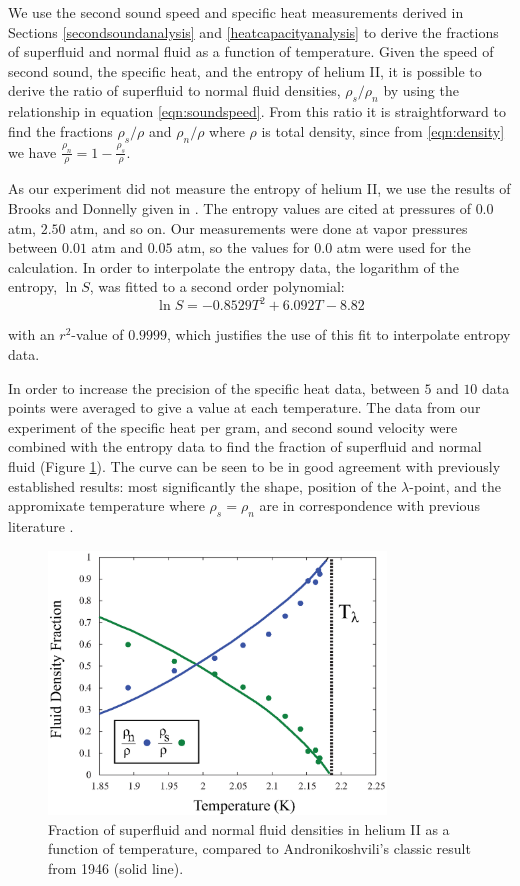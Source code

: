 We use the second sound speed and specific heat measurements derived
in Sections \ref{secondsoundanalysis} and \ref{heatcapacityanalysis}
to derive the fractions of superfluid and normal fluid as a function
of temperature. Given the speed of second sound, the specific heat,
and the entropy of helium II, it is possible to derive the ratio of
superfluid to normal fluid densities, $\rho_s/\rho_n$ by using the
relationship in equation \ref{eqn:soundspeed}. From this ratio it is
straightforward to find the fractions $\rho_s/\rho$ and $\rho_n/\rho$
where $\rho$ is total density, since from \ref{eqn:density} we have
$\frac{\rho_n}{\rho} = 1 - \frac{\rho_s}{\rho}$.

As our experiment did not measure the entropy of helium II, we use the
results of Brooks and Donnelly given in \cite{brooks}. The entropy
values are cited at pressures of $0.0$ atm, $2.50$ atm, and so on. Our
measurements were done at vapor pressures between $0.01$ atm and
$0.05$ atm, so the values for $0.0$ atm were used for the calculation.
In order to interpolate the entropy data, the logarithm of the
entropy, $\ln S$, was fitted to a second order polynomial:
\begin{equation}
\ln S = -0.8529T^2 + 6.092T - 8.82
\end{equation}

with an $r^2$-value of $0.9999$, which justifies the use of this fit
to interpolate entropy data.

In order to increase the precision of the specific heat data, between
$5$ and $10$ data points were averaged to give a value at each
temperature. The data from our experiment of the specific heat per
gram, and second sound velocity were combined with the entropy data to
find the fraction of superfluid and normal fluid
(Figure \ref{fig:density}). The curve can be seen to be in good agreement with
previously established results: most significantly the shape, position
of the $\lambda$-point, and the appromixate temperature where $\rho_s
= \rho_n$ are in correspondence with previous literature \cite{andro}.

\begin{figure}[htbp]
\begin{center}
\includegraphics[height=70mm]{./figures/density.eps}
\caption{\small{Fraction of superfluid and normal fluid densities in
    helium II as a function of temperature, compared to
    Andronikoshvili's classic result from 1946 (solid
    line)\cite{andro}.}}
\label{fig:density}
\end{center}
\end{figure}
